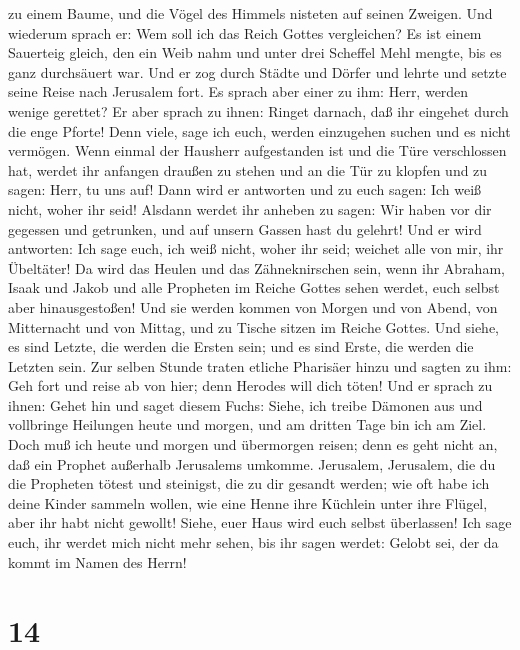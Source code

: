 zu einem Baume, und die Vögel des Himmels nisteten auf seinen Zweigen.
 Und wiederum sprach er: Wem soll ich das Reich Gottes
vergleichen?  Es ist einem Sauerteig gleich, den ein Weib
nahm und unter drei Scheffel Mehl mengte, bis es ganz durchsäuert war.
 Und er zog durch Städte und Dörfer und lehrte und setzte
seine Reise nach Jerusalem fort.  Es sprach aber einer zu
ihm: Herr, werden wenige gerettet? Er aber sprach zu ihnen:
 Ringet darnach, daß ihr eingehet durch die enge Pforte!
Denn viele, sage ich euch, werden einzugehen suchen und es nicht
vermögen.  Wenn einmal der Hausherr aufgestanden ist und
die Türe verschlossen hat, werdet ihr anfangen draußen zu stehen und an
die Tür zu klopfen und zu sagen: Herr, tu uns auf! Dann wird er
antworten und zu euch sagen: Ich weiß nicht, woher ihr seid!
 Alsdann werdet ihr anheben zu sagen: Wir haben vor dir
gegessen und getrunken, und auf unsern Gassen hast du gelehrt!
 Und er wird antworten: Ich sage euch, ich weiß nicht,
woher ihr seid; weichet alle von mir, ihr Übeltäter!  Da
wird das Heulen und das Zähneknirschen sein, wenn ihr Abraham, Isaak und
Jakob und alle Propheten im Reiche Gottes sehen werdet, euch selbst aber
hinausgestoßen!  Und sie werden kommen von Morgen und von
Abend, von Mitternacht und von Mittag, und zu Tische sitzen im Reiche
Gottes.  Und siehe, es sind Letzte, die werden die Ersten
sein; und es sind Erste, die werden die Letzten sein. 
Zur selben Stunde traten etliche Pharisäer hinzu und sagten zu ihm: Geh
fort und reise ab von hier; denn Herodes will dich töten!
 Und er sprach zu ihnen: Gehet hin und saget diesem
Fuchs: Siehe, ich treibe Dämonen aus und vollbringe Heilungen heute und
morgen, und am dritten Tage bin ich am Ziel.  Doch muß
ich heute und morgen und übermorgen reisen; denn es geht nicht an, daß
ein Prophet außerhalb Jerusalems umkomme.  Jerusalem,
Jerusalem, die du die Propheten tötest und steinigst, die zu dir gesandt
werden; wie oft habe ich deine Kinder sammeln wollen, wie eine Henne
ihre Küchlein unter ihre Flügel, aber ihr habt nicht gewollt!
 Siehe, euer Haus wird euch selbst überlassen! Ich sage
euch, ihr werdet mich nicht mehr sehen, bis ihr sagen werdet: Gelobt
sei, der da kommt im Namen des Herrn!

\hypertarget{section-13}{%
\section{14}\label{section-13}}

